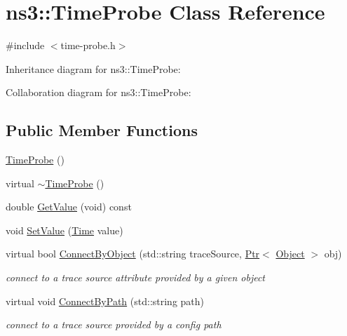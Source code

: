 \hypertarget{classns3_1_1TimeProbe}{}\section{ns3\+:\+:Time\+Probe Class Reference}
\label{classns3_1_1TimeProbe}


{\ttfamily \#include $<$time-\/probe.\+h$>$}



Inheritance diagram for ns3\+:\+:Time\+Probe\+:


Collaboration diagram for ns3\+:\+:Time\+Probe\+:
\subsection*{Public Member Functions}
\begin{DoxyCompactItemize}
\item 
\hyperlink{classns3_1_1TimeProbe_a6d7260d9accd81dc6c507ef6864b3c32}{Time\+Probe} ()
\item 
virtual \hyperlink{classns3_1_1TimeProbe_a4b72a0f8107f341c8afe43264a6ea679}{$\sim$\+Time\+Probe} ()
\item 
double \hyperlink{classns3_1_1TimeProbe_a205df868c7268a2a6d57d8e49df256cb}{Get\+Value} (void) const 
\item 
void \hyperlink{classns3_1_1TimeProbe_a5a24c1f0fc702ab94f60793f2a3cad96}{Set\+Value} (\hyperlink{classns3_1_1Time}{Time} value)
\item 
virtual bool \hyperlink{classns3_1_1TimeProbe_a01778c1013aca0788e98085fc86ab136}{Connect\+By\+Object} (std\+::string trace\+Source, \hyperlink{classns3_1_1Ptr}{Ptr}$<$ \hyperlink{classns3_1_1Object}{Object} $>$ obj)
\begin{DoxyCompactList}\small\item\em connect to a trace source attribute provided by a given object \end{DoxyCompactList}\item 
virtual void \hyperlink{classns3_1_1TimeProbe_a537eb677001130b775c926e2432ad84e}{Connect\+By\+Path} (std\+::string path)
\begin{DoxyCompactList}\small\item\em connect to a trace source provided by a config path \end{DoxyCompactList}\end{DoxyCompactItemize}
